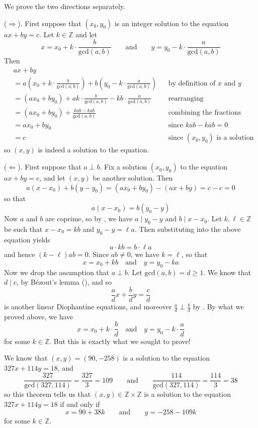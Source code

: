 \begin{cproof}
We prove the two directions separately.

($\Rightarrow$). First suppose that $(x_0,y_0)$ is an integer solution to the equation $ax+by=c$. Let $k \in \mathbb{Z}$ and let
\[ x = x_0 + k \cdot \frac{b}{\mathrm{gcd}(a,b)} \qquad \text{and} \qquad y = y_0 - k \cdot \frac{a}{\mathrm{gcd}(a,b)} \]
Then
\begin{align*}
& ax+by && \\
&= a \left( x_0 + k \cdot \frac{b}{\mathrm{gcd}(a,b)} \right) + b \left( y_0 - k \cdot \frac{a}{\mathrm{gcd}(a,b)} \right) && \text{by definition of $x$ and $y$} \\
&= (ax_0 + by_0) + ak \cdot \frac{b}{\mathrm{gcd}(a,b)} - kb \cdot \frac{a}{\mathrm{gcd}(a,b)} && \text{rearranging} \\
&= (ax_0 + by_0) + \frac{kab-kab}{\mathrm{gcd}(a,b)} && \text{combining the fractions} \\
&= ax_0 + by_0 && \text{since $kab-kab=0$} \\
&= c && \text{since $(x_0,y_0)$ is a solution}
\end{align*}
so $(x,y)$ is indeed a solution to the equation.

($\Leftarrow$). First suppose that $a \perp b$. Fix a solution $(x_0,y_0)$ to the equation $ax+by=c$, and let $(x,y)$ be another solution. Then
\[ a(x-x_0) + b(y-y_0) = (ax_0 + by_0) - (ax+by) = c-c = 0 \]
so that
\[ a(x-x_0) = b(y_0-y) \]
Now $a$ and $b$ are coprime, so by , we have $a \mid y_0-y$ and $b \mid x-x_0$. Let $k,\ell \in \mathbb{Z}$ be such that $x-x_0=kb$ and $y_0-y = \ell a$. Then substituting into the above equation yields
\[ a \cdot k b = b \cdot \ell a \]
and hence $(k-\ell)ab = 0$. Since $ab \ne 0$, we have $k=\ell$, so that
\[ x = x_0 + kb \quad \text{and} \quad y = y_0-ka \]
Now we drop the assumption that $a \perp b$. Let $\mathrm{gcd}(a,b) = d \ge 1$. We know that $d \mid c$, by B\'{e}zout's lemma (), and so 
\[ \frac{a}{d} x + \frac{b}{d} y = \frac{c}{d} \]
is another linear Diophantine equations, and moreover $\frac{a}{d} \perp \frac{b}{d}$ by . By what we proved above, we have
\[ x = x_0 + k \cdot \frac{b}{d} \quad \text{and} \quad y=y_0-k \cdot \frac{a}{d} \]
for some $k \in \mathbb{Z}$. But this is exactly what we sought to prove!
\end{cproof}

\begin{example}
We know that $(x,y) = (90,{-258})$ is a solution to the equation $327x+114y=18$, and
\[ \displaystyle \frac{327}{\mathrm{gcd}(327,114)} = \frac{327}{3} = 109 \qquad \text{and} \qquad \displaystyle \frac{114}{\mathrm{gcd}(327,114)} = \frac{114}{3} = 38 \]
so this theorem tells us that $(x,y) \in \mathbb{Z} \times \mathbb{Z}$ is a solution to the equation $327x+114y=18$ if and only if
\[ x = 90 + 38k \qquad \text{and} \qquad y = -258-109k \]
for some $k \in \mathbb{Z}$.
\end{example}

